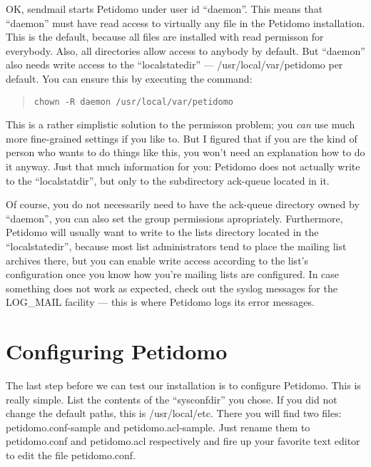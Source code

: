 \documentclass[a4paper,10pt]{scrreprt}
\begin{document}
OK, sendmail starts Petidomo under user id ``daemon''. This means that
``daemon'' must have read access to virtually any file in the Petidomo
installation. This is the default, because all files are installed
with read permisson for everybody. Also, all directories allow access
to anybody by default. But ``daemon'' also needs write access to the
``localstatedir'' --- {\sf /usr/local/var/petidomo} per default. You
can ensure this by executing the command:
\begin{quote}
\begin{verbatim}
chown -R daemon /usr/local/var/petidomo
\end{verbatim}
\end{quote}

This is a rather simplistic solution to the permisson problem; you
\emph{can} use much more fine-grained settings if you like to. But I
figured that if you are the kind of person who wants to do things like
this, you won't need an explanation how to do it anyway. Just that
much information for you: Petidomo does not actually write to the
``localstatdir'', but only to the subdirectory {\sf ack-queue} located
in it.

Of course, you do not necessarily need to have the {\sf ack-queue}
directory owned by ``daemon'', you can also set the group permissions
apropriately. Furthermore, Petidomo will usually want to write to the
{\sf lists} directory located in the ``localstatedir'', because most
list administrators tend to place the mailing list archives there, but
you can enable write access according to the list's configuration once
you know how you're mailing lists are configured. In case something
does not work as expected, check out the syslog messages for the {\sf
LOG\_MAIL} facility --- this is where Petidomo logs its error messages.

\section{Configuring Petidomo}

The last step before we can test our installation is to configure
Petidomo. This is really simple. List the contents of the
``sysconfdir'' you chose. If you did not change the default paths,
this is {\sf /usr/local/etc}. There you will find two files: {\sf
petidomo.conf-sample} and {\sf petidomo.acl-sample}. Just rename them
to {\sf petidomo.conf} and {\sf petidomo.acl} respectively and fire up
your favorite text editor to edit the file {\sf petidomo.conf}.
\end{document}
